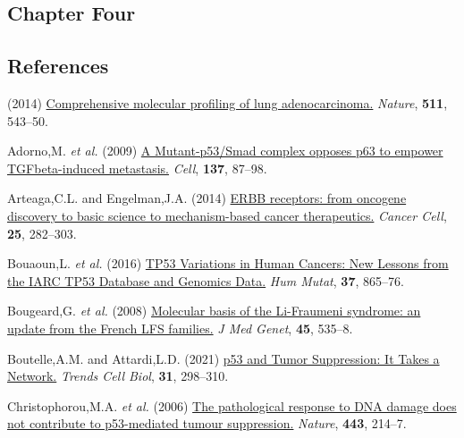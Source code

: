 \hypertarget{chapter-four}{%
\subsection{Chapter Four}\label{chapter-four}}

\hypertarget{references}{%
\subsection{References}\label{references}}

\hypertarget{refs}{}
\begin{CSLReferences}{1}{0}
\leavevmode{}%
(2014) \href{https://doi.org/10.1038/nature13385}{Comprehensive molecular profiling of lung adenocarcinoma.} \emph{Nature}, \textbf{511}, 543--50.

\leavevmode{}%
Adorno,M. \emph{et al.} (2009) \href{https://doi.org/10.1016/j.cell.2009.01.039}{A Mutant-p53/Smad complex opposes p63 to empower TGFbeta-induced metastasis.} \emph{Cell}, \textbf{137}, 87--98.

\leavevmode{}%
Arteaga,C.L. and Engelman,J.A. (2014) \href{https://doi.org/10.1016/j.ccr.2014.02.025}{ERBB receptors: from oncogene discovery to basic science to mechanism-based cancer therapeutics.} \emph{Cancer Cell}, \textbf{25}, 282--303.

\leavevmode{}%
Bouaoun,L. \emph{et al.} (2016) \href{https://doi.org/10.1002/humu.23035}{TP53 Variations in Human Cancers: New Lessons from the IARC TP53 Database and Genomics Data.} \emph{Hum Mutat}, \textbf{37}, 865--76.

\leavevmode{}%
Bougeard,G. \emph{et al.} (2008) \href{https://doi.org/10.1136/jmg.2008.057570}{Molecular basis of the Li-Fraumeni syndrome: an update from the French LFS families.} \emph{J Med Genet}, \textbf{45}, 535--8.

\leavevmode{}%
Boutelle,A.M. and Attardi,L.D. (2021) \href{https://doi.org/10.1016/j.tcb.2020.12.011}{p53 and Tumor Suppression: It Takes a Network.} \emph{Trends Cell Biol}, \textbf{31}, 298--310.

\leavevmode{}%
Christophorou,M.A. \emph{et al.} (2006) \href{https://doi.org/10.1038/nature05077}{The pathological response to DNA damage does not contribute to p53-mediated tumour suppression.} \emph{Nature}, \textbf{443}, 214--7.


\end{CSLReferences}
